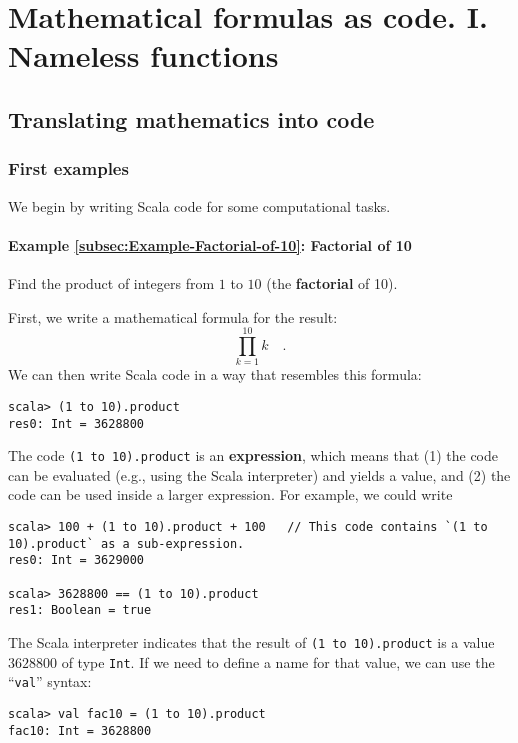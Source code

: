 
\chapter{Mathematical formulas as code. I. Nameless functions\label{chap:1-Values,-types,-expressions,}}

\section{Translating mathematics into code}

\subsection{First examples}

We begin by writing Scala code for some computational tasks.

\subsubsection{Example \label{subsec:Example-Factorial-of-10}\ref{subsec:Example-Factorial-of-10}:
Factorial of 10}

Find the product of integers from $1$ to $10$ (the \textbf{factorial}
of 10).

First, we write a mathematical formula for the result:
\[
\prod_{k=1}^{10}k\quad.
\]
We can then write Scala code in a way that resembles this formula:
\begin{lstlisting}
scala> (1 to 10).product
res0: Int = 3628800
\end{lstlisting}

The code \texttt{}\lstinline!(1 to 10).product! is an \textbf{expression},
which means that (1) the code can be evaluated (e.g., using the Scala
interpreter) and yields a value, and (2) the code can be used inside
a larger expression. For example, we could write
\begin{lstlisting}
scala> 100 + (1 to 10).product + 100   // This code contains `(1 to 10).product` as a sub-expression.
res0: Int = 3629000

scala> 3628800 == (1 to 10).product 
res1: Boolean = true
\end{lstlisting}
The Scala interpreter indicates that the result of \texttt{}\lstinline!(1 to 10).product!
is a value $3628800$ of type \lstinline!Int!. If we need to define
a name for that value, we can use the \textsf{``}\lstinline!val!\textsf{''} syntax:
\begin{lstlisting}
scala> val fac10 = (1 to 10).product
fac10: Int = 3628800
\end{lstlisting}


